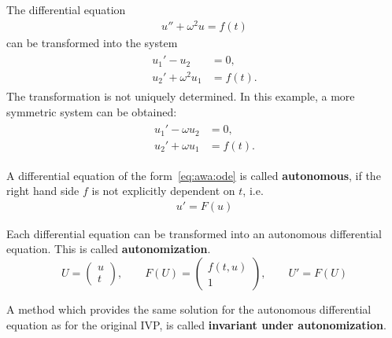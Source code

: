 \begin{example}
  \label{ex:awa:sine-1}
  The differential equation
  \begin{gather}
    \label{eq:awa:17}
    u'' + \omega^2 u = f(t)
  \end{gather}
  can be transformed into the system
  \begin{gather}
    \label{eq:awa:18}
    \begin{split}
      u_1' - u_2 &= 0, \\
      u_2' + \omega^2 u_1 &= f(t).
    \end{split}
  \end{gather}
  The transformation is not uniquely determined. In this example, a
  more symmetric system can be obtained:
  \begin{gather}
    \label{eq:awa:18a}
    \begin{split}
      u_1' - \omega u_2 &= 0, \\
      u_2' + \omega u_1 &= f(t).
    \end{split}
  \end{gather}
\end{example}


\begin{definition}
  A differential equation of the form~\eqref{eq:awa:ode} is called
  \textbf{autonomous},  if
  the right hand side $f$ is not explicitly dependent on $t$, i.e.
  \begin{gather}
    u'=F(u)
  \end{gather}
\end{definition}


\begin{definition}[Autonomization]
  \label{definition:autonomization}
  Each differential equation can be transformed into an autonomous
  differential equation.  This is called
  \textbf{autonomization}. 
  \begin{equation*}
    U = \begin{pmatrix} u \\ t \end{pmatrix},
    \qquad
    F(U) = \begin{pmatrix} f(t,u) \\ 1 \end{pmatrix},
    \qquad
    U' = F(U)
  \end{equation*}

  A method which provides the same solution for the autonomous
  differential equation as for the original IVP, is called
  \textbf{invariant under autonomization}.
\end{definition}


